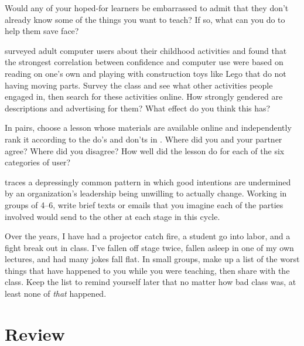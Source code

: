 
Would any of your hoped-for learners be embarrassed to admit that
they don't already know some of the things you want to teach?
If so,
what can you do to help them save face?


\cite{Cutt2017} surveyed adult computer users about their childhood activities
and found that the strongest correlation between confidence and computer use
were based on reading on one's own and playing with construction toys like Lego that do not having moving parts.
Survey the class and see what other activities people engaged in,
then search for these activities online.
How strongly gendered are descriptions and advertising for them?
What effect do you think this has?


In pairs,
choose a lesson whose materials are available online
and independently rank it according to the do's and don'ts in
.
Where did you and your partner agree?
Where did you disagree?
How well did the lesson do for each of the six categories of user?


\cite{Coco2018} traces a depressingly common pattern
in which good intentions are undermined by
an organization's leadership being unwilling to actually change.
Working in groups of 4--6,
write brief texts or emails that you imagine each of the parties involved would send to the other
at each stage in this cycle.


Over the years,
I have had a projector catch fire,
a student go into labor,
and a fight break out in class.
I've fallen off stage twice,
fallen asleep in one of my own lectures,
and had many jokes fall flat.
In small groups,
make up a list of the worst things that have happened to you while you were teaching,
then share with the class.
Keep the list to remind yourself later that no matter how bad class was,
at least none of \emph{that} happened.

\section*{Review}


